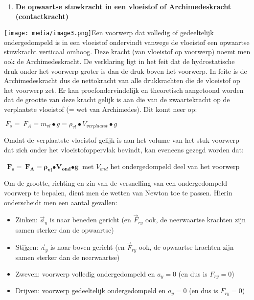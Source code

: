 \documentclass{ximera}
\begin{document}
\begin{enumerate}
\def\labelenumi{\arabic{enumi}.}
\setcounter{enumi}{2}
\item
  \textbf{De opwaartse stuwkracht in een vloeistof of Archimedeskracht
  (contactkracht)}
\end{enumerate}

\texttt{[image: media/image3.png]}Een
voorwerp dat volledig of gedeeltelijk ondergedompeld is in een vloeistof
ondervindt vanwege de vloeistof een opwaartse stuwkracht verticaal
omhoog. Deze kracht (van vloeistof op voorwerp) noemt men ook de
Archimedeskracht. De verklaring ligt in het feit dat de hydrostatische
druk onder het voorwerp groter is dan de druk boven het voorwerp. In
feite is de Archimedeskracht dus de nettokracht van alle drukkrachten
die de vloeistof op het voorwerp zet. Er kan proefondervindelijk en
theoretisch aangetoond worden dat de grootte van deze kracht gelijk is
aan die van de zwaartekracht op de verplaatste vloeistof (= wet van
Archimedes). Dit komt neer op:

\({\ F}_{s} = {\ F}_{A} = m_{vl} \bullet g = \rho_{vl} \bullet V_{verplaatst} \bullet g\)

Omdat de verplaatste vloeistof gelijk is aan het volume van het stuk
voorwerp dat zich onder het vloeistofoppervlak bevindt, kan eveneens
gezegd worden dat:

\({\mathbf{\ \ }\mathbf{F}}_{\mathbf{s}}\mathbf{=}{\mathbf{\ }\mathbf{F}}_{\mathbf{A}}\mathbf{=}\mathbf{\rho}_{\mathbf{vl}}\mathbf{\bullet}\mathbf{V}_{\mathbf{ond}}\mathbf{\bullet g\ }\)
met \(V_{ond}\) het ondergedompeld deel van het voorwerp

Om de grootte, richting en zin van de versnelling van een ondergedompeld
voorwerp te bepalen, dient men de wetten van Newton toe te passen.
Hierin onderscheidt men een aantal gevallen:

\begin{itemize}
\item
  Zinken: \({\overrightarrow{a}}_{y}\) is naar beneden gericht (en
  \({\overrightarrow{F}}_{ry}\) ook, de neerwaartse krachten zijn samen
  sterker dan de opwaartse)
\item
  Stijgen: \({\overrightarrow{a}}_{y}\) is naar boven gericht (en
  \({\overrightarrow{F}}_{ry}\) ook, de opwaartse krachten zijn samen
  sterker dan de neerwaartse)
\item
  Zweven: voorwerp volledig ondergedompeld en \(a_{y} = 0\) (en dus is
  \(F_{ry} = 0\))
\item
  Drijven: voorwerp gedeeltelijk ondergedompeld en \(a_{y} = 0\) (en dus
  is \(F_{ry} = 0\))
\end{itemize}
\end{document}
